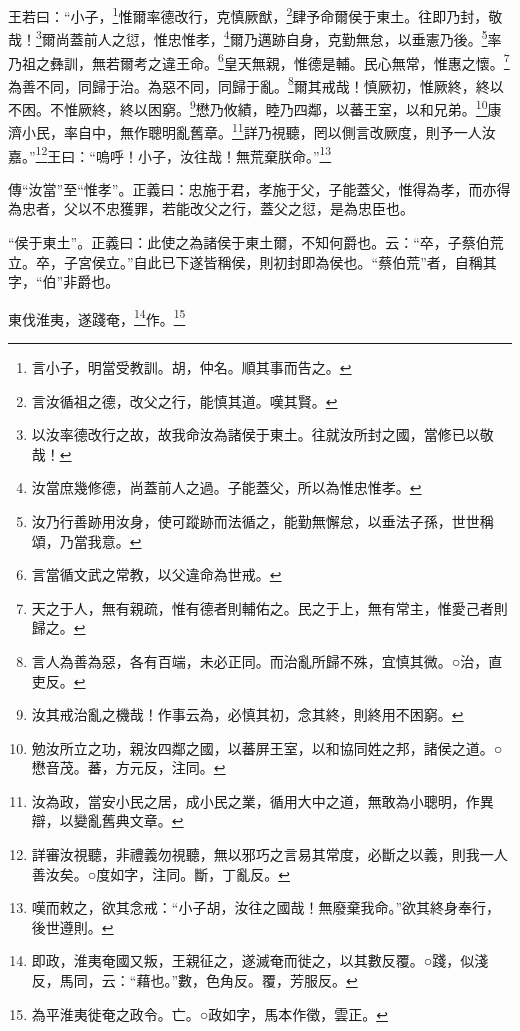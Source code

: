 王若曰：“小子，\footnote{言小子，明當受教訓。胡，仲名。順其事而告之。}惟爾率德改行，克慎厥猷，\footnote{言汝循祖之德，改父之行，能慎其道。嘆其賢。}肆予命爾侯于東土。往即乃封，敬哉！\footnote{以汝率德改行之故，故我命汝為諸侯于東土。往就汝所封之國，當修已以敬哉！}爾尚蓋前人之愆，惟忠惟孝，\footnote{汝當庶幾修德，尚蓋前人之過。子能蓋父，所以為惟忠惟孝。}爾乃邁跡自身，克勤無怠，以垂憲乃後。\footnote{汝乃行善跡用汝身，使可蹤跡而法循之，能勤無懈怠，以垂法子孫，世世稱頌，乃當我意。}率乃祖之彝訓，無若爾考之違王命。\footnote{言當循文武之常教，以父違命為世戒。}皇天無親，惟德是輔。民心無常，惟惠之懷。\footnote{天之于人，無有親疏，惟有德者則輔佑之。民之于上，無有常主，惟愛己者則歸之。}為善不同，同歸于治。為惡不同，同歸于亂。\footnote{言人為善為惡，各有百端，未必正同。而治亂所歸不殊，宜慎其微。○治，直吏反。}爾其戒哉！慎厥初，惟厥終，終以不困。不惟厥終，終以困窮。\footnote{汝其戒治亂之機哉！作事云為，必慎其初，念其終，則終用不困窮。}懋乃攸績，睦乃四鄰，以蕃王室，以和兄弟。\footnote{勉汝所立之功，親汝四鄰之國，以蕃屏王室，以和協同姓之邦，諸侯之道。○懋音茂。蕃，方元反，注同。}康濟小民，率自中，無作聰明亂舊章。\footnote{汝為政，當安小民之居，成小民之業，循用大中之道，無敢為小聰明，作異辯，以變亂舊典文章。}詳乃視聽，罔以側言改厥度，則予一人汝嘉。”\footnote{詳審汝視聽，非禮義勿視聽，無以邪巧之言易其常度，必斷之以義，則我一人善汝矣。○度如字，注同。斷，丁亂反。}王曰：“嗚呼！小子，汝往哉！無荒棄朕命。”\footnote{嘆而敕之，欲其念戒：“小子胡，汝往之國哉！無廢棄我命。”欲其終身奉行，後世遵則。}


{\noindent\zhuan{}\fzbyks 傳“汝當”至“惟孝”。正義曰：忠施于君，孝施于父，子能蓋父，惟得為孝，而亦得為忠者，父以不忠獲罪，若能改父之行，蓋父之愆，是為忠臣也。 \par}

{\noindent\shu{}\fzkt “侯于東土”。正義曰：此使之為諸侯于東土爾，不知何爵也。云：“卒，子蔡伯荒立。卒，子宮侯立。”自此已下遂皆稱侯，則初封即為侯也。“蔡伯荒”者，自稱其字，“伯”非爵也。 \par}

東伐淮夷，遂踐奄，\footnote{即政，淮夷奄國又叛，王親征之，遂滅奄而徙之，以其數反覆。○踐，似淺反，馬同，云：“藉也。”數，色角反。覆，芳服反。}作。\footnote{為平淮夷徙奄之政令。亡。○政如字，馬本作徵，雲正。}


